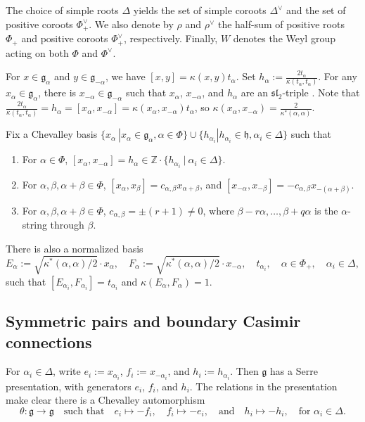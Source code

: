 \documentclass[10pt]{amsart}
\numberwithin{equation}{section}
\theoremstyle{definition}
\newcommand{\g}{\mathfrak{g}}
\newcommand{\h}{\mathfrak{h}}
\begin{document}
 The choice of simple roots $\Delta$ yields the set of simple coroots $\Delta^{\vee}$ and the set of positive coroots $\Phi^{\vee}_+$. We also denote by $\rho$ and $\rho^{\vee}$ the half-sum of positive roots $\Phi_+$ and positive coroots $\Phi^{\vee}_+$, respectively. Finally, $W$ denotes the Weyl group acting on both $\Phi$ and $\Phi^{\vee}$.

For $x\in \g_{\alpha}$ and $y\in \g_{-\alpha}$, we have $[x,y] = \kappa(x,y)t_{\alpha}$. Set $h_{\alpha}:=\frac{2t_{\alpha}}{\kappa(t_{\alpha}, t_{\alpha})}$. For any $x_{\alpha}\in \g_{\alpha}$, there is $x_{-\alpha}\in \g_{-\alpha}$ such that $x_{\alpha}$, $x_{-\alpha}$, and $h_{\alpha}$ are an $\mathfrak{sl}_2$-triple \cite[Section 8.3]{MR323842}. Note that $\frac{2t_{\alpha}}{\kappa(t_{\alpha}, t_{\alpha})}=h_{\alpha}=[x_{\alpha},x_{-\alpha}]=\kappa(x_{\alpha},x_{-\alpha})t_{\alpha}$, so $\kappa(x_{\alpha},x_{-\alpha}) = \frac{2}{\kappa^*(\alpha,\alpha)}$. 
      
Fix a Chevalley basis \cite[Section 25.2]{MR323842} $\{x_{\alpha} \ | x_{\alpha}\in \g_{\alpha}, \alpha \in \Phi\}\cup \{h_{\alpha_i} | h_{\alpha_i}\in \h, \alpha_i\in \Delta\}$ such that 
\begin{enumerate}
    \item For $\alpha \in \Phi$, $[x_{\alpha},x_{-\alpha}] = h_{\alpha}\in \mathbb{Z}\cdot\{h_{\alpha_i} \ | \ \alpha_i\in \Delta\}$.
    \item For $\alpha, \beta, \alpha+\beta\in \Phi$, $[x_{\alpha},x_{\beta}] = c_{\alpha,\beta}x_{\alpha+\beta}$, and $[x_{-\alpha},x_{-\beta}] = -c_{\alpha,\beta}x_{-(\alpha+\beta)}$.
    \item For $\alpha, \beta, \alpha+\beta\in \Phi$, $c_{\alpha, \beta} = \pm (r+1)\ne 0$, where $\beta - r\alpha, \dots, \beta+q\alpha$ is the $\alpha$-string through $\beta$.
\end{enumerate} 
There is also a normalized basis 
\[
E_{\alpha}:=\sqrt{\kappa^*(\alpha,\alpha)/2}\cdot x_{\alpha}, \quad  F_{\alpha}:=\sqrt{\kappa^*(\alpha,\alpha)/2}\cdot x_{-\alpha}, \quad t_{\alpha_i}, \quad \alpha\in \Phi_+,\quad \alpha_i\in \Delta,
\]
such that $[E_{\alpha_i},F_{\alpha_i}]=t_{\alpha_i}$ and $\kappa(E_{\alpha},F_{\alpha})=1$.

\subsection{Symmetric pairs and boundary Casimir connections}

For $\alpha_i\in \Delta$, write $e_i:=x_{\alpha_i}$, $f_i:=x_{-\alpha_i}$, and $h_{i}:=h_{\alpha_i}$. Then $\g$ has a Serre presentation, with generators $e_{i}$, $f_{i}$, and $h_{i}$. The relations in the presentation make clear there is a Chevalley automorphism
\begin{equation}\label{eq:Chevalleyauto}
\theta: \g\rightarrow \g \quad \text{such that} \quad e_{i}\mapsto -f_{i}, \quad f_{i}\mapsto -e_{i}, \quad \text{and}  \quad h_{i} \mapsto - h_{i}, \quad \text{for $\alpha_i\in \Delta$.}
\end{equation}
\end{document}
